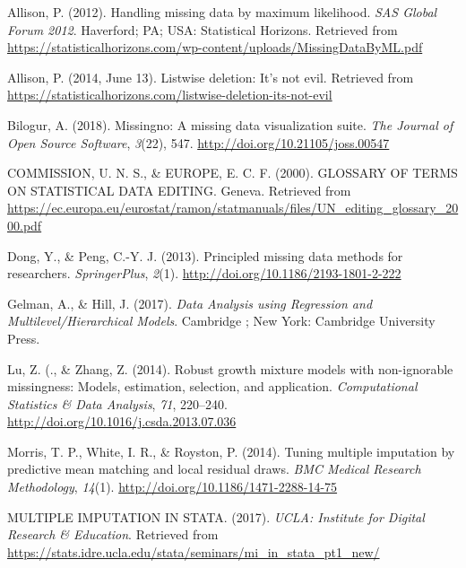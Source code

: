 \documentclass[12pt,oneside]{chicagocapstone}
\begin{document}

\noindent

\setlength{\parindent}{-0.20in} \setlength{\leftskip}{0.20in}
\setlength{\parskip}{8pt}

\hypertarget{refs}{}
\hypertarget{ref-allison_handling_2012}{}
Allison, P. (2012). Handling missing data by maximum likelihood.
\emph{SAS Global Forum 2012}. Haverford; PA; USA: Statistical Horizons.
Retrieved from
\url{https://statisticalhorizons.com/wp-content/uploads/MissingDataByML.pdf}

\hypertarget{ref-allison_handling_2014}{}
Allison, P. (2014, June 13). Listwise deletion: It's not evil. Retrieved
from
\url{https://statisticalhorizons.com/listwise-deletion-its-not-evil}

\hypertarget{ref-bilogur_missingno_2018}{}
Bilogur, A. (2018). Missingno: A missing data visualization suite.
\emph{The Journal of Open Source Software}, \emph{3}(22), 547.
\url{http://doi.org/10.21105/joss.00547}

\hypertarget{ref-econ_commission}{}
COMMISSION, U. N. S., \& EUROPE, E. C. F. (2000). GLOSSARY OF TERMS ON
STATISTICAL DATA EDITING. Geneva. Retrieved from
\url{https://ec.europa.eu/eurostat/ramon/statmanuals/files/UN_editing_glossary_2000.pdf}

\hypertarget{ref-peng_dong}{}
Dong, Y., \& Peng, C.-Y. J. (2013). Principled missing data methods for
researchers. \emph{SpringerPlus}, \emph{2}(1).
\url{http://doi.org/10.1186/2193-1801-2-222}

\hypertarget{ref-gelman_data_2017}{}
Gelman, A., \& Hill, J. (2017). \emph{Data Analysis using Regression and
Multilevel/Hierarchical Models}. Cambridge ; New York: Cambridge
University Press.

\hypertarget{ref-lu_robust_2014}{}
Lu, Z. (., \& Zhang, Z. (2014). Robust growth mixture models with
non-ignorable missingness: Models, estimation, selection, and
application. \emph{Computational Statistics \& Data Analysis},
\emph{71}, 220--240. \url{http://doi.org/10.1016/j.csda.2013.07.036}

\hypertarget{ref-morris_tuning_2014}{}
Morris, T. P., White, I. R., \& Royston, P. (2014). Tuning multiple
imputation by predictive mean matching and local residual draws.
\emph{BMC Medical Research Methodology}, \emph{14}(1).
\url{http://doi.org/10.1186/1471-2288-14-75}

\hypertarget{ref-introduction_to_sas_notitle_2017}{}
MULTIPLE IMPUTATION IN STATA. (2017). \emph{UCLA: Institute for Digital
Research \& Education}. Retrieved from
\url{https://stats.idre.ucla.edu/stata/seminars/mi_in_stata_pt1_new/}
\end{document}
